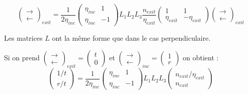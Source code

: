 \documentclass[a4paper,english]{article}
\begin{document}
\begin{dmath}
\begin{pmatrix}\rightarrow \\ \leftarrow\end{pmatrix}_{exit} =
\frac{1}{2 \eta_{inc}} \begin{pmatrix} \eta_{inc} & 1 \\ \eta_{inc} & -1 \end{pmatrix} L_1 L_2 L_3 \frac{n_{exit}}{\eta_{exit}} \begin{pmatrix} 1 & 1 \\ \eta_{exit} & -\eta_{exit} \end{pmatrix}
\begin{pmatrix}\rightarrow \\ \leftarrow\end{pmatrix}_{exit}
\end{dmath}

Les matrices $L$ ont la même forme que dans le cas perpendiculaire.

Si on prend $\begin{pmatrix}\rightarrow \\ \leftarrow\end{pmatrix}_{exit} = \begin{pmatrix}t \\ 0\end{pmatrix}$ et $\begin{pmatrix}\rightarrow \\ \leftarrow\end{pmatrix}_{inc} = \begin{pmatrix}1 \\ r\end{pmatrix}$ on obtient :
\begin{dmath}
\begin{pmatrix}1/t \\ r/t \end{pmatrix} = \frac{1}{2 \eta_{inc}} \begin{pmatrix} \eta_{inc} & 1 \\ \eta_{inc} & -1 \end{pmatrix} L_1 L_2 L_3 \begin{pmatrix} n_{exit}/\eta_{exit} \\ n_{exit} \end{pmatrix}
\end{dmath}
\end{document}
